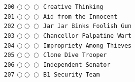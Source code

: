 \documentclass[a4paper,landscape]{article}
\begin{document}
\begin{multicols*}{5}
\texttt{200} \(\bigcirc\!\bigcirc\!\bigcirc\)  \texttt{Creative Thinking} \vspace{-0.3mm}\\ 
\texttt{201} \(\bigcirc\!\bigcirc\!\bigcirc\)  \texttt{Aid from the Innocent} \vspace{-0.3mm}\\ 
\texttt{202} \(\bigcirc\!\bigcirc\!\bigcirc\)  \texttt{Jar Jar Binks Foolish Gun} \vspace{-0.3mm}\\ 
\texttt{203} \(\bigcirc\!\bigcirc\!\bigcirc\)  \texttt{Chancellor Palpatine Wart} \vspace{-0.3mm}\\ 
\texttt{204} \(\bigcirc\!\bigcirc\!\bigcirc\)  \texttt{Impropriety Among Thieves} \vspace{-0.3mm}\\ 
\texttt{205} \(\bigcirc\!\bigcirc\!\bigcirc\)  \texttt{Clone Dive Trooper} \vspace{-0.3mm}\\ 
\texttt{206} \(\bigcirc\!\bigcirc\!\bigcirc\)  \texttt{Independent Senator} \vspace{-0.3mm}\\ 
\texttt{207} \(\bigcirc\!\bigcirc\!\bigcirc\)  \texttt{B1 Security Team} \vspace{-0.3mm}\\ 

\end{multicols*}
\end{document}
